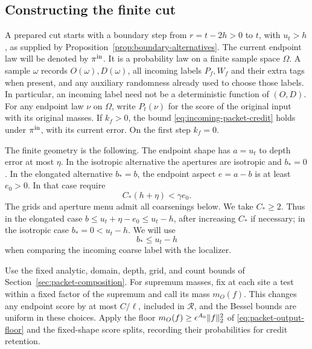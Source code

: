 \subsection{Constructing the finite cut}

A prepared cut starts with a boundary step from \(r=t-2h>0\) to \(t\),
with \(u_t>h\),
as supplied by Proposition~\ref{prop:boundary-alternatives}.
The current endpoint law will be denoted by \(\pi^{\rm in}\).
It is a probability law on a finite sample space \(\Omega\).
A sample \(\omega\) records \(O(\omega),D(\omega)\), all incoming
labels \(P_f,W_f\) and their extra tags when present, and any auxiliary
randomness already used to choose those labels.  In particular, an
incoming label need not be a deterministic function of \((O,D)\).
For any endpoint law \(\nu\) on \(\Omega\), write \(P_t(\nu)\)
for the score of the original input with its original masses.
If \(k_f>0\), the bound \eqref{eq:incoming-packet-credit} holds under
\(\pi^{\rm in}\), with its current error.  On the first step
\(k_f=0\).

The finite geometry is the following.  The endpoint shape has
\(a=u_t\) to depth error at most \(\eta\).  In the isotropic
alternative the apertures are isotropic and \(b_*=0\).  In the
elongated alternative \(b_*=b\), the endpoint aspect \(e=a-b\)
is at least \(e_0>0\).  In that case require
\begin{equation}
 C_*(h+\eta)<\gamma e_0 .
 \label{eq:repayment-eccentricity}
\end{equation}
The grids and aperture menu admit all coarsenings below.  We take
\(C_*\ge2\).  Thus in the elongated case
\(b\le u_t+\eta-e_0\le u_t-h\), after increasing \(C_*\) if
necessary; in the isotropic case \(b_*=0<u_t-h\).  We will use
\begin{equation}
 b_*\le u_t-h
 \label{eq:repayment-localizer-depth}
\end{equation}
when comparing the incoming coarse label with the localizer.

Use the fixed analytic, domain, depth, grid, and count bounds of
Section~\ref{sec:packet-composition}.  For supremum masses, fix at
each site a test within a fixed factor of the supremum and call its
mass \(m_O(f)\).  This changes any endpoint score by at most
\(C/\ell\), included in \(\mathcal R\), and the Bessel bounds are
uniform in these choices.  Apply the floor
\(m_O(f)\ge\epsilon^{A_0}\|f\|_2^2\) of
\eqref{eq:packet-output-floor} and the fixed-shape score splits,
recording their probabilities for credit retention.

